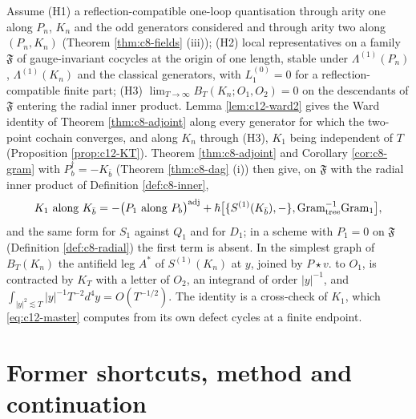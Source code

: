 \begin{remark}[$K=P^\dagger$ as a cross-check]
\label{rem:c12-KP}
Assume (H1) a reflection-compatible one-loop quantisation through arity one along $P_n$, $K_n$ and the odd generators considered and through arity two along $(P_n,K_n)$ (Theorem \ref{thm:c8-fields} (iii)); (H2) local representatives on a family $\mathfrak F$ of gauge-invariant cocycles at the origin of one length, stable under $\Lambda^{(1)}(P_n)$, $\Lambda^{(1)}(K_n)$ and the classical generators, with $L_1^{(0)}=0$ for a reflection-compatible finite part; (H3) $\lim_{T\to\infty}B_T(K_n;O_1,O_2)=0$ on the descendants of $\mathfrak F$ entering the radial inner product. Lemma \ref{lem:c12-ward2} gives the Ward identity of Theorem \ref{thm:c8-adjoint} along every generator for which the two-point cochain converges, and along $K_n$ through (H3), $K_1$ being independent of $T$ (Proposition \ref{prop:c12-KT}). Theorem \ref{thm:c8-adjoint} and Corollary \ref{cor:c8-gram} with $P_b^\dagger=-K_{\bar b}$ (Theorem \ref{thm:c8-dag} (i)) then give, on $\mathfrak F$ with the radial inner product of Definition \ref{def:c8-inner},
\[
K_1\ \text{along}\ K_{\bar b}=-\big(P_1\ \text{along}\ P_b\big)^{\rm adj}+\hbar\big[\{S^{(1)}(K_{\bar b}),-\},\mathrm{Gram}_{\rm tree}^{-1}\mathrm{Gram}_1\big],
\]
and the same form for $S_1$ against $Q_1$ and for $D_1$; in a scheme with $P_1=0$ on $\mathfrak F$ (Definition \ref{def:c8-radial}) the first term is absent. In the simplest graph of $B_T(K_n)$ the antifield leg $A^*$ of $S^{(1)}(K_n)$ at $y$, joined by $P\star v.$ to $O_1$, is contracted by $K_T$ with a letter of $O_2$, an integrand of order $|y|^{-1}$, and $\int_{|y|^2\lesssim T}|y|^{-1}T^{-2}d^4y=O(T^{-1/2})$. The identity is a cross-check of $K_1$, which \eqref{eq:c12-master} computes from its own defect cycles at a finite endpoint.
\end{remark}

\section{Former shortcuts, method and continuation}

